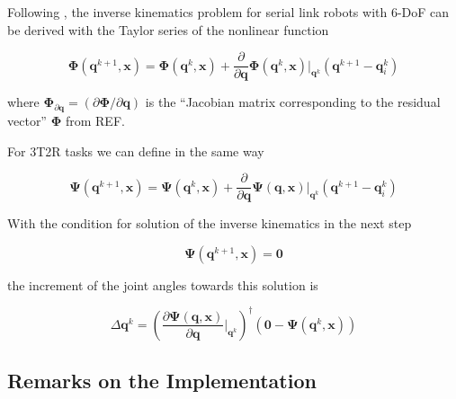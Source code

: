 \documentclass[twocolumn,10pt]{IFTOMM}
\newcommand{\bm}[1]{\boldsymbol{#1}}
\begin{document}



Following \cite{GoldenbergBenFen1985}, the inverse kinematics problem for serial link robots with 6-DoF can be derived with the Taylor series of the nonlinear function 

\begin{equation}
\bm{\Phi}(\bm{q}^{k+1},\bm{x}) = 
\bm{\Phi}(\bm{q}^{k},\bm{x})
+
\frac{\partial}{\partial \bm{q}} \bm{\Phi}(\bm{q}^k,\bm{x}) \biggr\rvert_{\bm{q}^k} (\bm{q}^{k+1} - \bm{q}_i^k)
\end{equation}

where $\bm{\Phi}_{\partial\bm{q}}=(\partial \bm{\Phi} / \partial \bm{q})$ is the ``Jacobian matrix corresponding to the residual vector'' $\bm{\Phi}$ from REF.

For 3T2R tasks we can define in the same way
 
\begin{equation}
\bm{\Psi}(\bm{q}^{k+1},\bm{x}) = 
\bm{\Psi}(\bm{q}^{k},\bm{x})
+
\frac{\partial}{\partial \bm{q}} \bm{\Psi}(\bm{q},\bm{x}) \biggr\rvert_{\bm{q}^k} (\bm{q}^{k+1} - \bm{q}_i^k)
\end{equation}

With the condition for solution of the inverse kinematics in the next step

\begin{equation}
\bm{\Psi}(\bm{q}^{k+1},\bm{x})=\bm{0}
\end{equation}

the increment of the joint angles towards this solution is

\begin{equation}
\Delta \bm{q}^k
=
\left(\frac{\partial \bm{\Psi}(\bm{q},\bm{x})}{\partial \bm{q}}\biggr\rvert_{\bm{q}^k}\right)^{\dagger}
(\bm{0} - \bm{\Psi}(\bm{q}^{k},\bm{x}))
\end{equation}  




\subsection{Remarks on the Implementation}
\end{document}

